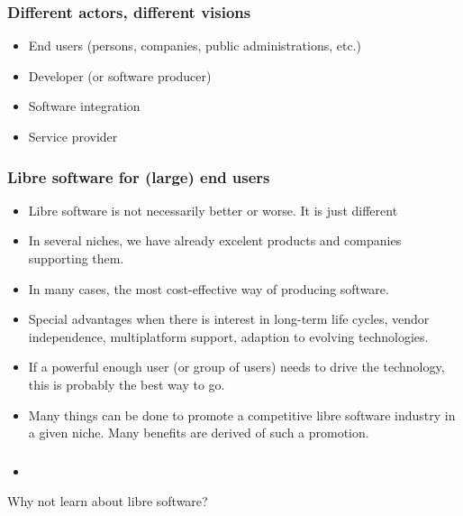 \documentclass{beamer}
\begin{document}

\begin{frame}
\frametitle{Different actors, different visions}

\begin{itemize}
\item End users (persons, companies, public administrations, etc.)
\item Developer (or software producer)
\item Software integration
\item Service provider
\end{itemize}

\end{frame}



\begin{frame}
\frametitle{Libre software for (large) end users}

\begin{itemize}
\item Libre software is not necessarily better or worse. It is 
  just different
\item In several niches, we have already excelent products and
  companies supporting them.
\item In many cases, the most cost-effective way of producing
  software.
\item Special advantages when there is interest in long-term life
  cycles, vendor independence, multiplatform support, adaption to
  evolving technologies.
\item If a powerful enough user (or group of users) needs to drive the
  technology, this is probably the best way to go.
\item Many things can be done to promote a competitive
  libre software industry in a given niche. Many benefits
  are derived of such a promotion.
\end{itemize}
\end{frame}


\begin{frame}
\frametitle{}

\begin{itemize}
\item 
\end{itemize}

\end{frame}



\begin{frame}

\begin{center}
{\LARGE
Why not learn about libre software?
}
\end{center}


\end{frame}
\end{document}
